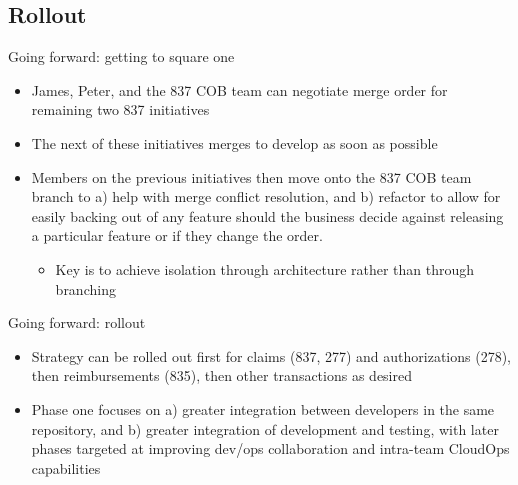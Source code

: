 \documentclass{beamer}
\begin{document}
	\subsection{Rollout}
	\begin{frame}{Going forward: getting to square one}
		\begin{itemize}
			\item James, Peter, and the 837 COB team can negotiate merge order for remaining two 837 initiatives \pause
			\item The next of these initiatives merges to develop as soon as possible \pause
			\item Members on the previous initiatives then move onto the 837 COB team branch to a) help with merge conflict resolution, and b) refactor to allow for easily backing out of any feature should the business decide against releasing a particular feature or if they change the order. \pause
			\begin{itemize}
				\item Key is to achieve isolation through architecture rather than through branching \pause
			\end{itemize}
		\end{itemize}
	\end{frame}
	\begin{frame}{Going forward: rollout}
		\begin{itemize}
			\item Strategy can be rolled out first for claims (837, 277) and authorizations (278), then reimbursements (835), then other transactions as desired \pause
			\item Phase one focuses on a) greater integration between developers in the same repository, and b) greater integration of development and testing, with later phases targeted at improving dev/ops collaboration and intra-team CloudOps capabilities
		\end{itemize}
	\end{frame}
	\begin{frame}[plain]
		\titlepage
	\end{frame}
\end{document}
